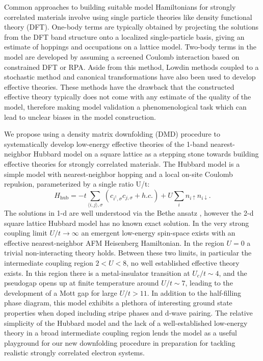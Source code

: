\documentclass[12pt]{article}
\begin{document}
Common approaches to building suitable model Hamiltonians for strongly correlated materials involve using single particle theories like density functional theory (DFT).
One-body terms are typically obtained by projecting the solutions from the DFT band structure onto a localized single-particle basis, giving an estimate of hoppings and occupations on a lattice model.
Two-body terms in the model are developed by assuming a screened Coulomb interaction based on constrained DFT or RPA.
Aside from this method, Lowdin methods coupled to a stochastic method and canonical transformations have also been used to develop effective theories.
These methods have the drawback that the constructed effective theory typically does not come with any estimate of the quality of the model, therefore making model validation a phenomenological task which can lead to unclear biases in the model construction.

We propose using a density matrix downfolding (DMD) procedure to systematically develop low-energy effective theories of the 1-band nearest-neighbor Hubbard model on a square lattice as a stepping stone towards building effective theories for strongly correlated materials. The Hubbard model is a simple model with nearest-neighbor hopping and a local on-site Coulomb repulsion, parameterized by a single ratio U/t: 
\begin{equation}
H_\text{hub} = -t \sum_{\langle i,j \rangle,\sigma}( c_{i^\dagger,\sigma} c_{j,\sigma} + h.c.) + U \sum_i n_{i\uparrow} n_{i\downarrow}
\label{hubbard}.
\end{equation}
The solutions in 1-d are well understood via the Bethe ansatz , however the 2-d square lattice Hubbard model has no known exact solution.  In the very strong coupling limit $U/t \rightarrow \infty$ an emergent low-energy spin-space exists with an effective nearest-neighbor AFM Heisenberg Hamiltonian. In the region $U = 0$ a trivial non-interacting theory holds. Between these two limits, in particular the intermediate coupling region $2 < U < 8$, no well established effective theory exists. In this region there is a metal-insulator transition at $U_c/t \sim 4$, and the pseudogap opens up at finite temperature around $U/t \sim 7$, leading to the development of a Mott gap for large $U/t > 11$. In addition to the half-filling phase diagram, this model exhibits a plethora of interesting ground state properties when doped including stripe phases and d-wave pairing. The relative simplicity of the Hubbard model and the lack of a well-established low-energy theory in a broad intermediate coupling region lends the model as a useful playground for our new downfolding procedure in preparation for tackling realistic strongly correlated electron systems. 
\end{document}
